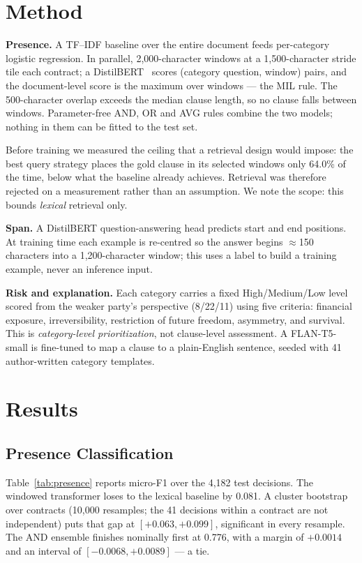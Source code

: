 \documentclass[journal,a4paper]{IEEEtran}
\begin{document}
\section{Method}
\textbf{Presence.} A TF--IDF baseline over the entire document feeds per-category logistic
regression. In parallel, 2{,}000-character windows at a 1{,}500-character stride tile each
contract; a DistilBERT~\cite{distilbert} scores (category question, window) pairs, and the
document-level score is the maximum over windows --- the MIL rule. The 500-character overlap
exceeds the median clause length, so no clause falls between windows. Parameter-free AND, OR and
AVG rules combine the two models; nothing in them can be fitted to the test set.

Before training we measured the ceiling that a retrieval design would impose: the best query
strategy places the gold clause in its selected windows only 64.0\% of the time, below what the
baseline already achieves. Retrieval was therefore rejected on a measurement rather than an
assumption. We note the scope: this bounds \emph{lexical} retrieval only.

\textbf{Span.} A DistilBERT question-answering head predicts start and end positions. At
training time each example is re-centred so the answer begins $\approx$150 characters into a
1{,}200-character window; this uses a label to build a training example, never an inference
input.

\textbf{Risk and explanation.} Each category carries a fixed High/Medium/Low level scored from
the weaker party's perspective (8/22/11) using five criteria: financial exposure,
irreversibility, restriction of future freedom, asymmetry, and survival. This is
\emph{category-level prioritization}, not clause-level assessment. A FLAN-T5-small is fine-tuned
to map a clause to a plain-English sentence, seeded with 41 author-written category templates.

\section{Results}

\subsection{Presence Classification}
Table~\ref{tab:presence} reports micro-F1 over the 4{,}182 test decisions. The windowed
transformer loses to the lexical baseline by 0.081. A cluster bootstrap over contracts
(10{,}000 resamples; the 41 decisions within a contract are not independent) puts that gap at
$[+0.063,+0.099]$, significant in every resample. The AND ensemble finishes nominally first at
0.776, with a margin of $+0.0014$ and an interval of $[-0.0068,+0.0089]$ --- a tie.
\end{document}
